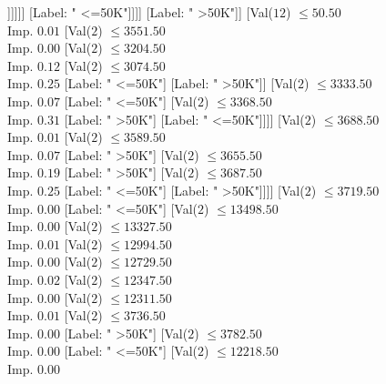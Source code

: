 \documentclass[margin=10pt]{standalone}
\begin{document}
\begin{forest}
																				[Val($2$) $ \leq 2689.50$ \\ Imp. $0.25$
																					[Label: " >50K"]
																					[Label: " <=50K"]]]]]]
																[Label: " <=50K"]]]]
													[Label: " >50K"]]
												[Val($12$) $ \leq 50.50$ \\ Imp. $0.01$
													[Val($2$) $ \leq 3551.50$ \\ Imp. $0.00$
														[Val($2$) $ \leq 3204.50$ \\ Imp. $0.12$
															[Val($2$) $ \leq 3074.50$ \\ Imp. $0.25$
																[Label: " <=50K"]
																[Label: " >50K"]]
															[Val($2$) $ \leq 3333.50$ \\ Imp. $0.07$
																[Label: " <=50K"]
																[Val($2$) $ \leq 3368.50$ \\ Imp. $0.31$
																	[Label: " >50K"]
																	[Label: " <=50K"]]]]
														[Val($2$) $ \leq 3688.50$ \\ Imp. $0.01$
															[Val($2$) $ \leq 3589.50$ \\ Imp. $0.07$
																[Label: " >50K"]
																[Val($2$) $ \leq 3655.50$ \\ Imp. $0.19$
																	[Label: " >50K"]
																	[Val($2$) $ \leq 3687.50$ \\ Imp. $0.25$
																		[Label: " <=50K"]
																		[Label: " >50K"]]]]
															[Val($2$) $ \leq 3719.50$ \\ Imp. $0.00$
																[Label: " <=50K"]
																[Val($2$) $ \leq 13498.50$ \\ Imp. $0.00$
																	[Val($2$) $ \leq 13327.50$ \\ Imp. $0.01$
																		[Val($2$) $ \leq 12994.50$ \\ Imp. $0.00$
																			[Val($2$) $ \leq 12729.50$ \\ Imp. $0.02$
																				[Val($2$) $ \leq 12347.50$ \\ Imp. $0.00$
																					[Val($2$) $ \leq 12311.50$ \\ Imp. $0.01$
																						[Val($2$) $ \leq 3736.50$ \\ Imp. $0.00$
																							[Label: " >50K"]
																							[Val($2$) $ \leq 3782.50$ \\ Imp. $0.00$
																								[Label: " <=50K"]
																								[Val($2$) $ \leq 12218.50$ \\ Imp. $0.00$

\end{forest}
\end{document}

